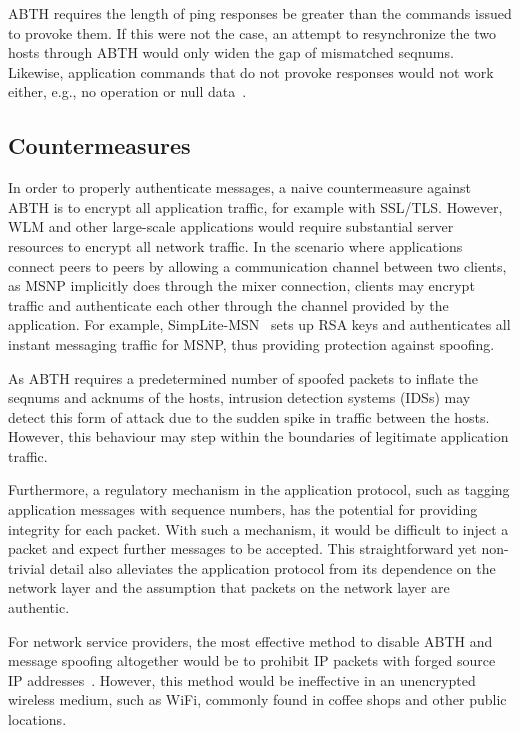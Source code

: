\documentclass{sig-alternate}
\begin{document}
ABTH requires the length of ping responses be greater than the commands issued to provoke them.
If this were not the case, an attempt to resynchronize the two hosts through ABTH would only widen the gap of mismatched seqnums.
Likewise, application commands that do not provoke responses would not work either, e.g., no operation or null data~\cite{joncheray:1995}.

\subsection{Countermeasures}

In order to properly authenticate messages, a naive countermeasure against ABTH is to encrypt all application traffic, for example with SSL/TLS.
However, WLM and other large-scale applications would require substantial server resources to encrypt all network traffic.
In the scenario where applications connect peers to peers by allowing a communication channel between two clients, as MSNP implicitly does through the mixer connection, clients may encrypt traffic and authenticate each other through the channel provided by the application.
For example, SimpLite-MSN~\cite{secway:url} sets up RSA keys and authenticates all instant messaging traffic for MSNP, thus providing protection against spoofing.

As ABTH requires a predetermined number of spoofed packets to inflate the seqnums and acknums of the hosts, intrusion detection systems (IDSs) may detect this form of attack due to the sudden spike in traffic between the hosts.
However, this behaviour may step within the boundaries of legitimate application traffic.

Furthermore, a regulatory mechanism in the application protocol, such as tagging application messages with sequence numbers, has the potential for providing integrity for each packet.
With such a mechanism, it would be difficult to inject a packet and expect further messages to be accepted.
This straightforward yet non-trivial detail also alleviates the application protocol from its dependence on the network layer and the assumption that packets on the network layer are authentic.

For network service providers, the most effective method to disable ABTH and message spoofing altogether would be to prohibit IP packets with forged source IP addresses~\cite{templeton:spoof}.
However, this method would be ineffective in an unencrypted wireless medium, such as WiFi, commonly found in coffee shops and other public locations. 
\end{document}
